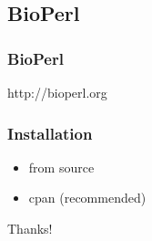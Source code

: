 \documentclass[UTF8]{beamer}
\begin{document}
\subsection{BioPerl}

\begin{frame}
  \frametitle{BioPerl}
  \centerline{http://bioperl.org}
\end{frame}

\begin{frame}
  \frametitle{Installation}
  \begin{itemize}
    \item from source
    \item cpan (recommended)
  \end{itemize}
\end{frame}


\begin{frame}
  \centerline{\huge{Thanks!}}
\end{frame}
\end{document}
